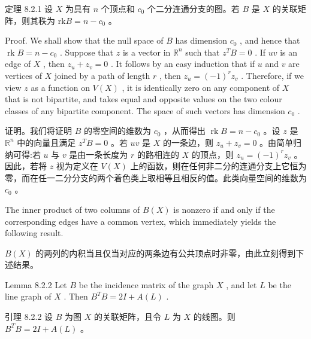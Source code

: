 \documentclass[10pt]{article}
\begin{document}
\begin{tcolorbox}\relax
定理 8.2.1 设 \(X\) 为具有 \(n\) 个顶点和 \({c}_{0}\) 个二分连通分支的图。若 \(B\) 是 \(X\) 的关联矩阵，则其秩为 \(\mathrm{{rk}}B = n - {c}_{0}\) 。
\end{tcolorbox}

Proof. We shall show that the null space of \(B\) has dimension \({c}_{0}\) , and hence that \(\operatorname{rk}B = n - {c}_{0}\) . Suppose that \(z\) is a vector in \({\mathbb{R}}^{n}\) such that \({z}^{T}B = 0\) . If \({uv}\) is an edge of \(X\) , then \({z}_{u} + {z}_{v} = 0\) . It follows by an easy induction that if \(u\) and \(v\) are vertices of \(X\) joined by a path of length \(r\) , then \({z}_{u} = {\left( -1\right) }^{r}{z}_{v}\) . Therefore, if we view \(z\) as a function on \(V\left( X\right)\) , it is identically zero on any component of \(X\) that is not bipartite, and takes equal and opposite values on the two colour classes of any bipartite component. The space of such vectors has dimension \({c}_{0}\) .

\begin{tcolorbox}\relax
证明。我们将证明 \(B\) 的零空间的维数为 \({c}_{0}\) ，从而得出 \(\operatorname{rk}B = n - {c}_{0}\) 。设 \(z\) 是 \({\mathbb{R}}^{n}\) 中的向量且满足 \({z}^{T}B = 0\) 。若 \({uv}\) 是 \(X\) 的一条边，则 \({z}_{u} + {z}_{v} = 0\) 。由简单归纳可得:若 \(u\) 与 \(v\) 是由一条长度为 \(r\) 的路相连的 \(X\) 的顶点，则 \({z}_{u} = {\left( -1\right) }^{r}{z}_{v}\) 。因此，若将 \(z\) 视为定义在 \(V\left( X\right)\) 上的函数，则在任何非二分的连通分支上它恒为零，而在任一二分分支的两个着色类上取相等且相反的值。此类向量空间的维数为 \({c}_{0}\) 。
\end{tcolorbox}

The inner product of two columns of \(B\left( X\right)\) is nonzero if and only if the corresponding edges have a common vertex, which immediately yields the following result.

\begin{tcolorbox}\relax
\(B\left( X\right)\) 的两列的内积当且仅当对应的两条边有公共顶点时非零，由此立刻得到下述结果。
\end{tcolorbox}

Lemma 8.2.2 Let \(B\) be the incidence matrix of the graph \(X\) , and let \(L\) be the line graph of \(X\) . Then \({B}^{T}B = {2I} + A\left( L\right)\) .

\begin{tcolorbox}\relax
引理 8.2.2 设 \(B\) 为图 \(X\) 的关联矩阵，且令 \(L\) 为 \(X\) 的线图。则 \({B}^{T}B = {2I} + A\left( L\right)\) 。
\end{tcolorbox}
\end{document}
